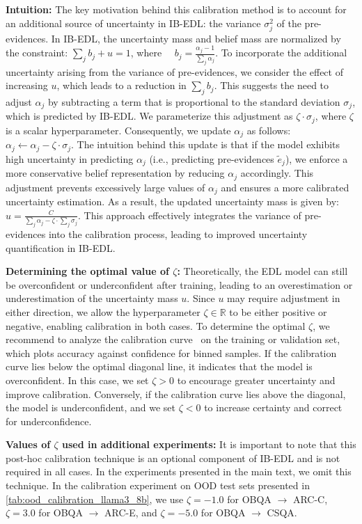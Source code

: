 \textbf{Intuition:} The key motivation behind this calibration method is to account for an additional source of uncertainty in IB-EDL: the variance \(\sigma_j^2\) of the pre-evidences. In IB-EDL, the uncertainty mass and belief mass are normalized by the constraint:
$\sum_j b_j + u = 1$, where $\quad b_j = \frac{\alpha_j - 1}{\sum_j \alpha_j}$. To incorporate the additional uncertainty arising from the variance of pre-evidences, we consider the effect of increasing $u$, which leads to a reduction in $\sum_j b_j$. This suggests the need to adjust $\alpha_j$ by subtracting a term that is proportional to the standard deviation $\sigma_j$, which is predicted by IB-EDL. We parameterize this adjustment as $\zeta \cdot \sigma_j$, where $\zeta$ is a scalar hyperparameter. Consequently, we update $\alpha_j$ as follows: $\alpha_j \leftarrow \alpha_j - \zeta \cdot \sigma_j$. The intuition behind this update is that if the model exhibits high uncertainty in predicting $\alpha_j$ (i.e., predicting pre-evidences $\tilde{e}_j$), we enforce a more conservative belief representation by reducing $\alpha_j$ accordingly. This adjustment prevents excessively large values of $\alpha_j$ and ensures a more calibrated uncertainty estimation. As a result, the updated uncertainty mass is given by: $u = \frac{C}{\sum_j \alpha_j - \zeta \cdot \sum_j \sigma_j}$. This approach effectively integrates the variance of pre-evidences into the calibration process, leading to improved uncertainty quantification in IB-EDL.

\textbf{Determining the optimal value of $\zeta$:} Theoretically, the EDL model can still be overconfident or underconfident after training, leading to an overestimation or underestimation of the uncertainty mass $u$. Since $u$ may require adjustment in either direction, we allow the hyperparameter $\zeta \in \mathbb{R}$ to be either positive or negative, enabling calibration in both cases. To determine the optimal $\zeta$, we recommend to analyze the calibration curve~\citep{guo2017calibration} on the training or validation set, which plots accuracy against confidence for binned samples. If the calibration curve lies below the optimal diagonal line, it indicates that the model is overconfident. In this case, we set $\zeta > 0$ to encourage greater uncertainty and improve calibration. Conversely, if the calibration curve lies above the diagonal, the model is underconfident, and we set $\zeta < 0$ to increase certainty and correct for underconfidence.

\textbf{Values of $\zeta$ used in additional experiments:} It is important to note that this post-hoc calibration technique is an optional component of IB-EDL and is not required in all cases. In the experiments presented in the main text, we omit this technique. In the calibration experiment on OOD test sets presented in \cref{tab:ood_calibration_llama3_8b}, we use $\zeta = -1.0$ for OBQA $\rightarrow$ ARC-C, $\zeta = 3.0$ for OBQA $\rightarrow$ ARC-E, and $\zeta = -5.0$ for OBQA $\rightarrow$ CSQA.

